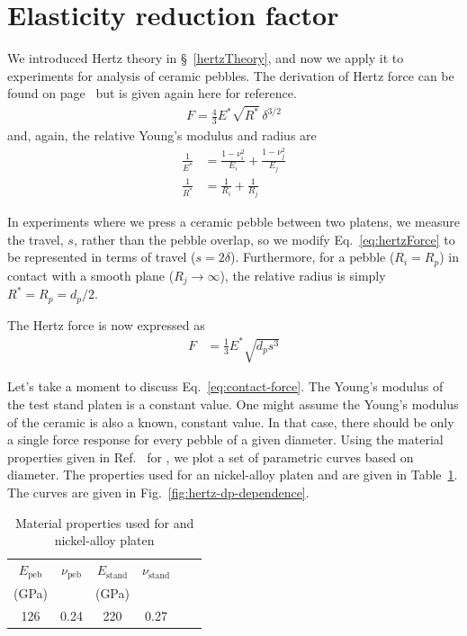 \section{Elasticity reduction factor}\label{sec:exp-reduction-factor}

We introduced Hertz theory in \S~\ref{hertzTheory}, and now we apply it to experiments for analysis of ceramic pebbles. The derivation of Hertz force can be found on page~\pageref{eq:hertzForce} but is given again here for reference.
\begin{align*}
F = \frac{4}{3}E^*\sqrt{R^*}\,\delta^{3/2}
\end{align*}
and, again, the relative Young's modulus and radius are
\begin{align*}
\frac{1}{E^*} & = \frac{1-\nu_i^2}{E_i} + \frac{1-\nu_j^2}{E_j} \\
\frac{1}{R^*} & = \frac{1}{R_i} + \frac{1}{R_j}
\end{align*}

In experiments where we press a ceramic pebble between two platens, we measure the travel, $s$, rather than the pebble overlap, so we modify Eq.~\ref{eq:hertzForce} to be represented in terms of travel ($s = 2\delta$). Furthermore, for a pebble ($R_i = R_p$) in contact with a smooth plane ($R_j \rightarrow \infty$), the relative radius is simply $R^* = R_p = d_p/2$.

The Hertz force is now expressed as
\begin{align}\label{eq:contact-force}
F& = \frac{1}{3}E^*\sqrt{d_ps^3}
\end{align}

Let's take a moment to discuss Eq.~\ref{eq:contact-force}. The Young's modulus of the test stand platen is a constant value. One might assume the Young's modulus of the ceramic is also a known, constant value. In that case, there should be only a single force response for every pebble of a given diameter. Using the material properties given in Ref.~\cite{Gierszewski1998} for \lit, we plot a set of parametric curves based on diameter. The properties used for an nickel-alloy platen and \lit are given in Table~\ref{tab:hertz-dp-study-props}. The curves are given in Fig.~\ref{fig:hertz-dp-dependence}.

\begin {table}[htp] %
\caption{Material properties used for \lit and nickel-alloy platen}
\label {tab:hertz-dp-study-props} \centering %
\begin {tabular}{ cccccc }
\toprule %
$E_\text{peb}$		&     $\nu_\text{peb}$	&	$E_\text{stand}$		&     $\nu_\text{stand}$	\\
(GPa)			&					&	(GPa)				&					\\\toprule
126				&	0.24				&	220					& 	0.27				\\\bottomrule
\end{tabular}
\end{table}


